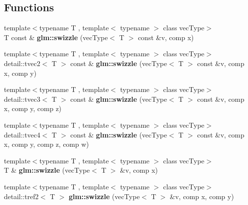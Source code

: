 \subsection*{Functions}
\begin{DoxyCompactItemize}
\item 
\hypertarget{group__gtc__swizzle_ga09b6f795bc75d7fa47085a715eb636c9}{{\footnotesize template$<$typename T , template$<$ typename $>$ class vec\-Type$>$ }\\T const \& {\bfseries glm\-::swizzle} (vec\-Type$<$ T $>$ const \&v, comp x)}\label{group__gtc__swizzle_ga09b6f795bc75d7fa47085a715eb636c9}

\item 
\hypertarget{group__gtc__swizzle_ga9eba89cade1f01221e5f4dc019b00245}{{\footnotesize template$<$typename T , template$<$ typename $>$ class vec\-Type$>$ }\\detail\-::tvec2$<$ T $>$ const \& {\bfseries glm\-::swizzle} (vec\-Type$<$ T $>$ const \&v, comp x, comp y)}\label{group__gtc__swizzle_ga9eba89cade1f01221e5f4dc019b00245}

\item 
\hypertarget{group__gtc__swizzle_gabf0ce6dc9ee0b7d6327e211760bb9d20}{{\footnotesize template$<$typename T , template$<$ typename $>$ class vec\-Type$>$ }\\detail\-::tvec3$<$ T $>$ const \& {\bfseries glm\-::swizzle} (vec\-Type$<$ T $>$ const \&v, comp x, comp y, comp z)}\label{group__gtc__swizzle_gabf0ce6dc9ee0b7d6327e211760bb9d20}

\item 
\hypertarget{group__gtc__swizzle_ga54740b832c0d65da8ca7c682d50f4ae5}{{\footnotesize template$<$typename T , template$<$ typename $>$ class vec\-Type$>$ }\\detail\-::tvec4$<$ T $>$ const \& {\bfseries glm\-::swizzle} (vec\-Type$<$ T $>$ const \&v, comp x, comp y, comp z, comp w)}\label{group__gtc__swizzle_ga54740b832c0d65da8ca7c682d50f4ae5}

\item 
\hypertarget{group__gtc__swizzle_gac4d0759e0f966baa98e69133c781bc9d}{{\footnotesize template$<$typename T , template$<$ typename $>$ class vec\-Type$>$ }\\T \& {\bfseries glm\-::swizzle} (vec\-Type$<$ T $>$ \&v, comp x)}\label{group__gtc__swizzle_gac4d0759e0f966baa98e69133c781bc9d}

\item 
\hypertarget{group__gtc__swizzle_gaff724836e02c36bf40441f5fae116b53}{{\footnotesize template$<$typename T , template$<$ typename $>$ class vec\-Type$>$ }\\detail\-::tref2$<$ T $>$ {\bfseries glm\-::swizzle} (vec\-Type$<$ T $>$ \&v, comp x, comp y)}\label{group__gtc__swizzle_gaff724836e02c36bf40441f5fae116b53}


\end{DoxyCompactItemize}
